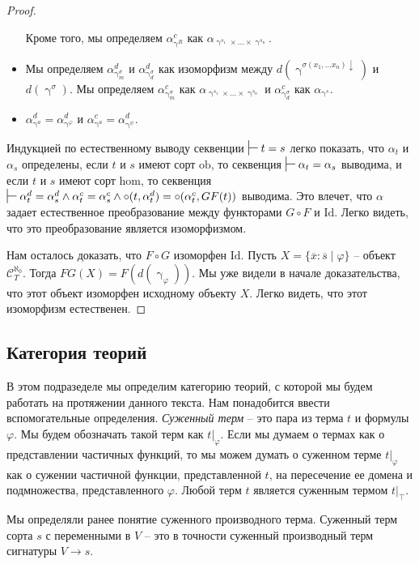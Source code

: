 \documentclass[reqno]{amsart}
\theoremstyle{definition}
\theoremstyle{remark}
\newcommand{\cat}[1]{\mathcal{#1}}
\newcommand{\fs}[1]{\mathrm{#1}}
\begin{document}
\begin{proof}
\begin{itemize}
Кроме того, мы определяем $\alpha^c_{\upgamma^R}$ как $\alpha_{\upgamma^{s_1} \times \ldots \times \upgamma^{s_n}}$.
\item Мы определяем $\alpha^d_{\upgamma^\sigma_m}$ и $\alpha^d_{\upgamma^\sigma_d}$ как изоморфизм между $d(\upgamma^{\sigma(x_1, \ldots x_n) \downarrow})$ и $d(\upgamma^\sigma)$.
Мы определяем $\alpha^c_{\upgamma^\sigma_m}$ как $\alpha_{\upgamma^{s_1} \times \ldots \times \upgamma^{s_n}}$ и $\alpha^c_{\upgamma^\sigma_d}$ как $\alpha_{\upgamma^s}$.
\item $\alpha^d_{\upgamma^a} = \alpha^d_{\upgamma^\varphi}$ и $\alpha^c_{\upgamma^a} = \alpha^d_{\upgamma^\psi}$.
\end{itemize}
Индукцией по естественному выводу секвенции $\sststile{}{} t = s$ легко показать, что $\alpha_t$ и $\alpha_s$ определены, если $t$ и $s$ имеют сорт $\fs{ob}$, то секвенция $\sststile{}{} \alpha_t = \alpha_s$ выводима,
и если $t$ и $s$ имеют сорт $\fs{hom}$, то секвенция $\sststile{}{} \alpha^d_t = \alpha^d_s \land \alpha^c_t = \alpha^c_s \land \circ(t,\alpha^d_t) = \circ(\alpha^c_t,GF(t))$ выводима.
Это влечет, что $\alpha$ задает естественное преобразование между функторами $G \circ F$ и $\fs{Id}$.
Легко видеть, что это преобразование является изоморфизмом.

Нам осталось доказать, что $F \circ G$ изоморфен $\fs{Id}$.
Пусть $X = \{ \overline{x} : \overline{s} \mid \varphi \}$ -- объект $\cat{C}_T^{\aleph_0}$.
Тогда $FG(X) = F(d(\upgamma_\varphi))$.
Мы уже видели в начале доказательства, что этот объект изоморфен исходному объекту $X$.
Легко видеть, что этот изоморфизм естественен.
\end{proof}

\subsection{Категория теорий}

В этом подразеделе мы определим категорию теорий, с которой мы будем работать на протяжении данного текста.
Нам понадобится ввести вспомогательные определения.
\emph{Суженный терм} -- это пара из терма $t$ и формулы $\varphi$.
Мы будем обозначать такой терм как $t|_\varphi$.
Если мы думаем о термах как о представлении частичных функций, то мы можем думать о суженном терме $t|_\varphi$ как о сужении частичной функции, представленной $t$, на пересечение ее домена и подмножества, представленного $\varphi$.
Любой терм $t$ является суженным термом $t|_\top$.

\begin{remark}
Мы определяли ранее понятие суженного производного терма.
Суженный терм сорта $s$ с переменными в $V$ -- это в точности суженный производный терм сигнатуры $V \to s$.
\end{remark}
\end{document}
